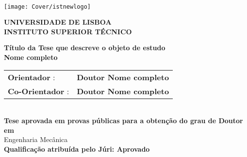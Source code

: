 \setcounter{page}{1} 


\thispagestyle{empty}
\begin{flushleft} ~\\ \vspace{-12mm} \hspace{-12mm}  \texttt{[image: Cover/istnewlogo]} 
 
\centering
\LARGE \textbf{UNIVERSIDADE DE LISBOA \\ INSTITUTO SUPERIOR TÉCNICO}
\vspace{10mm}

 
\centering
\Large \textbf{Título da Tese que descreve o objeto de estudo}
\\ \vspace{8mm}
\Large \textbf{Nome completo} \\
\vspace{8mm}

\Large
\begin{minipage}{\textwidth}
\begin{tabularx}{\textwidth}{ l @{ } l }
\textbf{Orientador} : & \textbf{Doutor Nome completo}\\
\textbf{Co-Orientador} :  & \textbf{Doutor Nome completo}\\
\end{tabularx}
\end{minipage}
\\ \vspace{8mm}
\centering
\Large \textbf{Tese aprovada em provas públicas para a obtenção do grau de Doutor em}\\
\Large Engenharia Mecânica\\
\vspace{5mm}
\Large \textbf{Qualificação atribuída pelo Júri: Aprovado}
 

\end{flushleft}
